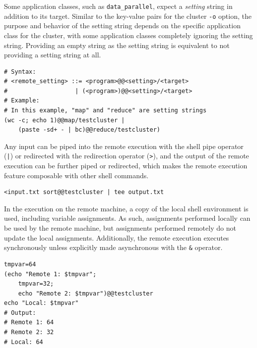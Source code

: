 \documentclass[twoside]{report}
\begin{document}
Some application classes, such as \texttt{data\_parallel}, expect a \textit{setting} string in addition to its target.
Similar to the key-value pairs for the cluster \texttt{-o} option, the purpose and behavior of the setting string depends on the specific application class for the cluster, with some application classes completely ignoring the setting string.
Providing an empty string as the setting string is equivalent to not providing a setting string at all.

\begin{minipage}[c]{\textwidth-15pt}
  \begin{lstlisting}[language=Shard]
# Syntax:
# <remote_setting> ::= <program>@@<setting>/<target>
#                   | (<program>)@@<setting>/<target>
# Example:
# In this example, "map" and "reduce" are setting strings
(wc -c; echo 1)@@map/testcluster |
    (paste -sd+ - | bc)@@reduce/testcluster)
\end{lstlisting}
  \smallskip
\end{minipage}

Any input can be piped into the remote execution with the shell pipe operator (\texttt{|}) or redirected with the redirection operator (\texttt{>}), and the output of the remote execution can be further piped or redirected, which makes the remote execution feature composable with other shell commands.

\begin{minipage}[c]{\textwidth-15pt}
  \begin{lstlisting}[language=Shard]
<input.txt sort@@testcluster | tee output.txt
\end{lstlisting}
  \smallskip
\end{minipage}

In the execution on the remote machine, a copy of the local shell environment is used, including variable assignments.
As such, assignments performed locally can be used by the remote machine, but assignments performed remotely do not update the local assignments.
Additionally, the remote execution executes synchronously unless explicitly made asynchronous with the \texttt{\&} operator.

\begin{minipage}[c]{\textwidth-15pt}
  \begin{lstlisting}[language=Shard]
tmpvar=64
(echo "Remote 1: $tmpvar";
    tmpvar=32;
    echo "Remote 2: $tmpvar")@@testcluster
echo "Local: $tmpvar"
# Output:
# Remote 1: 64
# Remote 2: 32
# Local: 64
\end{lstlisting}
  \smallskip
\end{minipage}
\end{document}

